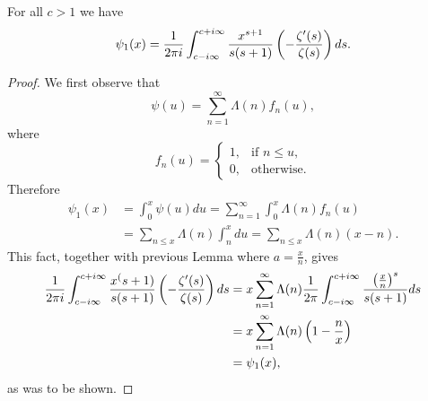 \begin{lemma}
	For all $c > 1$ we have
\begin{equation*}
	\psi_1(x) = \frac{1}{2 \pi i} \int _{c - i\infty} ^{c + i \infty} \frac{x^{s + 1}}{s(s + 1)} \left(-\frac{\zeta'(s)}{\zeta(s)}\right) ds.
\end{equation*}
\end{lemma}
\begin{proof}
	We first observe that
\begin{equation*}
	\psi(u) = \sum _{n=1} ^\infty \Lambda(n) f_n(u),
\end{equation*}
	where
\begin{equation*}
	f_n(u) = 
		\left\{
    		\begin{array}{ll}
        		1, &\text{if } n \leq u,\\
        		0, &\text{otherwise}.
        	\end{array}
		\right.
\end{equation*}
	Therefore
\begin{equation*}
\begin{aligned}	
	\psi_1(x)
		&= \int _0 ^x \psi(u) du = \sum _{n = 1} ^\infty \int _0 ^x \Lambda(n) f_n(u) \\ 
		&= \sum _{n \leq x} \Lambda(n) \int _n ^x du = \sum _{n \leq x} \Lambda(n)(x - n).
\end{aligned}
\end{equation*}
	This fact, together with previous Lemma where $a = \frac{x}{n}$, gives
\begin{equation*}
\begin{aligned}	
	\frac{1}{2 \pi i} \int _{c - i\infty} ^{c + i \infty} \frac{x^(s + 1)}{s(s + 1)} \left(-\frac{\zeta'(s)}{\zeta(s)}\right) ds 
		&= x \sum _{n = 1} ^\infty \Lambda(n) \frac{1}{2 \pi} \int _{c - i \infty} ^{c + i \infty} \frac{\left(\frac{x}{n}\right)^s}{s(s + 1)} ds \\
		&= x \sum _{n = 1} ^\infty \Lambda(n) \left(1 - \frac{n}{x}\right) \\
		&= \psi_1(x),
\end{aligned}
\end{equation*}
	as was to be shown.
\end{proof}


